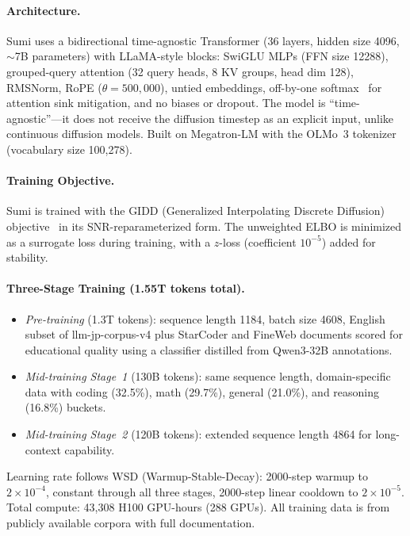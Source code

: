 \documentclass[11pt,a4paper]{article}
\begin{document}
\paragraph{Architecture.} Sumi uses a bidirectional time-agnostic Transformer (36 layers, hidden size 4096, $\sim$7B parameters) with LLaMA-style blocks: SwiGLU MLPs (FFN size 12288), grouped-query attention (32 query heads, 8 KV groups, head dim 128), RMSNorm, RoPE ($\theta=500{,}000$), untied embeddings, off-by-one softmax~\cite{miller2023} for attention sink mitigation, and no biases or dropout. The model is ``time-agnostic''---it does not receive the diffusion timestep as an explicit input, unlike continuous diffusion models. Built on Megatron-LM with the OLMo~3 tokenizer (vocabulary size 100,278).

\paragraph{Training Objective.} Sumi is trained with the GIDD (Generalized Interpolating Discrete Diffusion) objective~\cite{vonrutte2025,vonrutte2026} in its SNR-reparameterized form. The unweighted ELBO is minimized as a surrogate loss during training, with a $z$-loss (coefficient $10^{-5}$) added for stability.

\paragraph{Three-Stage Training (1.55T tokens total).}
\begin{itemize}
\item \emph{Pre-training} (1.3T tokens): sequence length 1184, batch size 4608, English subset of llm-jp-corpus-v4 plus StarCoder and FineWeb documents scored for educational quality using a classifier distilled from Qwen3-32B annotations.
\item \emph{Mid-training Stage~1} (130B tokens): same sequence length, domain-specific data with coding (32.5\%), math (29.7\%), general (21.0\%), and reasoning (16.8\%) buckets.
\item \emph{Mid-training Stage~2} (120B tokens): extended sequence length 4864 for long-context capability.
\end{itemize}
Learning rate follows WSD (Warmup-Stable-Decay): 2000-step warmup to $2\times10^{-4}$, constant through all three stages, 2000-step linear cooldown to $2\times10^{-5}$. Total compute: 43,308 H100 GPU-hours (288 GPUs). All training data is from publicly available corpora with full documentation.
\end{document}
